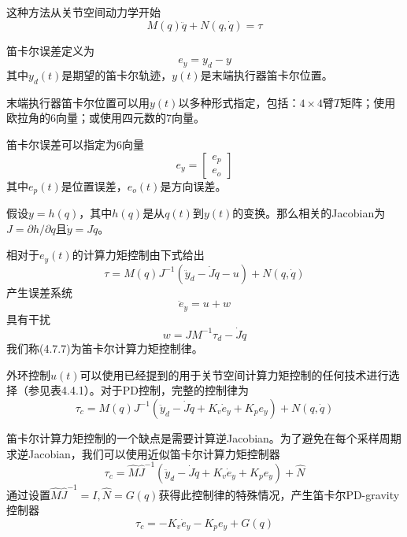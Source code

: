 \documentclass[UTF8]{ctexart}
\theoremstyle{definition}
\begin{document}
这种方法从关节空间动力学开始
\begin{equation}
    M(q)\ddot{q} + N(q, \dot{q}) = \tau
\end{equation}

笛卡尔误差定义为
\begin{equation}
    e_y = y_d - y
\end{equation}
其中$y_d(t)$是期望的笛卡尔轨迹，$y(t)$是末端执行器笛卡尔位置。

末端执行器笛卡尔位置可以用$y(t)$以多种形式指定，包括：$4 \times 4$臂$T$矩阵；使用欧拉角的6向量；或使用四元数的7向量。

笛卡尔误差可以指定为6向量
\begin{equation}
    e_y = \begin{bmatrix} e_p \\ e_o \end{bmatrix}
\end{equation}
其中$e_p(t)$是位置误差，$e_o(t)$是方向误差。

假设$y = h(q)$，其中$h(q)$是从$q(t)$到$y(t)$的变换。那么相关的Jacobian为$J = \partial h/\partial q$且$\dot{y} = J\dot{q}$。

相对于$e_y(t)$的计算力矩控制由下式给出
\begin{equation}
    \tau = M(q)J^{-1}(\ddot{y}_d - \dot{J}\dot{q} - u) + N(q, \dot{q})
\end{equation}
产生误差系统
\begin{equation}
    \ddot{e}_y = u + w
\end{equation}
具有干扰
\begin{equation}
    w = JM^{-1}\tau_d - \dot{J}\dot{q}
\end{equation}
我们称(4.7.7)为笛卡尔计算力矩控制律。

外环控制$u(t)$可以使用已经提到的用于关节空间计算力矩控制的任何技术进行选择（参见表4.4.1）。对于PD控制，完整的控制律为
\begin{equation}
    \tau_c = M(q)J^{-1}(\ddot{y}_d - \dot{J}\dot{q} + K_v\dot{e}_y + K_pe_y) + N(q, \dot{q})
\end{equation}

笛卡尔计算力矩控制的一个缺点是需要计算逆Jacobian。为了避免在每个采样周期求逆Jacobian，我们可以使用近似笛卡尔计算力矩控制器
\begin{equation}
    \tau_c = \hat{M}\hat{J}^{-1}(\ddot{y}_d - \dot{J}\dot{q} + K_v\dot{e}_y + K_pe_y) + \hat{N}
\end{equation}
通过设置$\hat{M}\hat{J}^{-1} = I, \hat{N} = G(q)$获得此控制律的特殊情况，产生笛卡尔PD-gravity控制器
\begin{equation}
    \tau_c = -K_v\dot{e}_y - K_pe_y + G(q)
\end{equation}
\end{document}
